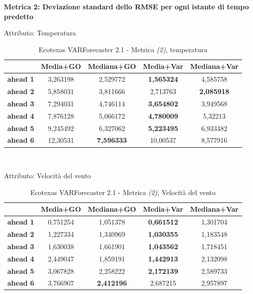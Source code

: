\documentclass[12pt,a4paper,oneside,openright]{book}
\begin{document}
\textbf{Metrica 2: Deviazione standard dello RMSE per ogni istante di tempo predetto}

\medskip


Attributo: Temperatura \\

\begin{table}[H]
\centering
\begin{tabular}{|c|c|c|c|c|}
\hline
 & \textbf{Media+GO} & \textbf{Mediana+GO} & \textbf{Media+Var} & \textbf{Mediana+Var} \\
\hline
\textbf{ahead 1} & 3,263198 & 2,529772 & \textbf{1,565324} & 4,585758 \\
\hline
\textbf{ahead 2} & 5,858031 & 3,811666 & 2,713763 & \textbf{2,085918} \\
\hline
\textbf{ahead 3} & 7,294031 & 4,746114 & \textbf{3,654802} & 3,949568 \\
\hline
\textbf{ahead 4} & 7,876128 & 5,066172 & \textbf{4,780009} & 5,32213 \\
\hline
\textbf{ahead 5} & 9,245492 & 6,327062 & \textbf{5,223495} & 6,933482 \\
\hline
\textbf{ahead 6} & 12,30531 & \textbf{7,596333} & 10,00537 & 8,577916 \\
\hline
\end{tabular} \\
\caption{Ecotexas VARForecaster 2.1 - Metrica \textit{(2)}, temperatura}
\end{table}

\medskip

Attributo: Velocità del vento \\ 

\begin{table}[H]
\centering
\begin{tabular}{|c|c|c|c|c|}
\hline
 & \textbf{Media+GO} & \textbf{Mediana+GO} & \textbf{Media+Var} & \textbf{Mediana+Var} \\
\hline
\textbf{ahead 1} & 0,751254 & 1,051378 & \textbf{0,661512} & 1,301704 \\
\hline
\textbf{ahead 2} & 1,227334 & 1,340969 & \textbf{1,030355} & 1,183548 \\
\hline
\textbf{ahead 3} & 1,630038 & 1,661901 & \textbf{1,043562} & 1,718451 \\
\hline
\textbf{ahead 4} & 2,449047 & 1,859191 & \textbf{1,442913} & 2,132098 \\
\hline
\textbf{ahead 5} & 3,067828 & 2,258222 & \textbf{2,172139} & 2,589733 \\
\hline
\textbf{ahead 6} & 3,766907 & \textbf{2,412196} & 2,687215 & 2,957897 \\
\hline
\end{tabular} \\
\caption{Ecotexas VARForecaster 2.1 - Metrica \textit{(2)}, Velocità del vento}
\end{table}
\end{document}
